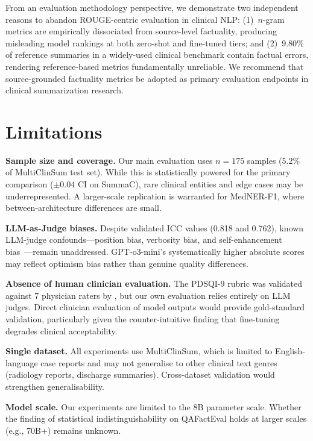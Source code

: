 \documentclass[11pt]{article}
\begin{document}
From an evaluation methodology perspective, we demonstrate two independent
reasons to abandon ROUGE-centric evaluation in clinical NLP: (1)~$n$-gram
metrics are empirically dissociated from source-level factuality, producing
misleading model rankings at both zero-shot and fine-tuned tiers; and
(2)~9.80\% of reference summaries in a widely-used clinical benchmark
contain factual errors, rendering reference-based metrics fundamentally
unreliable. We recommend that source-grounded factuality metrics be adopted
as primary evaluation endpoints in clinical summarization research.

\section*{Limitations}

\textbf{Sample size and coverage.} Our main evaluation uses $n=175$ samples
(5.2\% of MultiClinSum test set). While this is statistically powered for
the primary comparison ($\pm 0.04$ CI on SummaC), rare clinical entities and
edge cases may be underrepresented. A larger-scale replication is warranted
for MedNER-F1, where between-architecture differences are small.

\textbf{LLM-as-Judge biases.} Despite validated ICC values (0.818 and
0.762), known LLM-judge confounds---position bias, verbosity bias, and
self-enhancement bias~\citep{zheng2023judging}---remain unaddressed.
GPT-o3-mini's systematically higher absolute scores may reflect optimism
bias rather than genuine quality differences.

\textbf{Absence of human clinician evaluation.} The PDSQI-9 rubric was
validated against 7 physician raters by \citet{croxford2025pdsqi,
croxford2025evaluating}, but our own evaluation relies entirely on LLM
judges. Direct clinician evaluation of model outputs would provide
gold-standard validation, particularly given the counter-intuitive finding
that fine-tuning degrades clinical acceptability.

\textbf{Single dataset.} All experiments use MultiClinSum, which is limited
to English-language case reports and may not generalise to other clinical
text genres (radiology reports, discharge summaries). Cross-dataset
validation would strengthen generalisability.

\textbf{Model scale.} Our experiments are limited to the 8B parameter scale.
Whether the finding of statistical indistinguishability on QAFactEval holds
at larger scales (e.g., 70B+) remains unknown.
\end{document}
